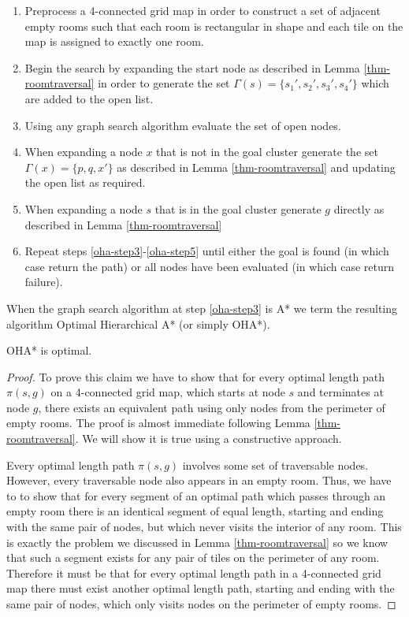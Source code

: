 \begin{enumerate}
\item{\label{oha-step1} Preprocess a 4-connected grid map in order to construct a set of adjacent empty rooms such that 
each room is rectangular in shape and each tile on the map is assigned to exactly one room. }
\item{\label{oha-step2} Begin the search by expanding the start node as described in 
Lemma \ref{thm-roomtraversal} in order to generate the set 
$\Gamma(s) = \lbrace s_{1}', s_{2}', s_{3}', s_{4}'\rbrace$ which are added to the open list. }
\item{\label{oha-step3} Using any graph search algorithm evaluate the set of open nodes.}
\item{\label{oha-step4} When expanding a node $x$ that is not in the goal cluster generate the set 
$\Gamma(x) = \lbrace p, q, x' \rbrace$ as described in Lemma \ref{thm-roomtraversal} and updating the open
list as required.} 
\item{\label{oha-step5} When expanding a node $s$ that is in the goal cluster generate $g$ directly as 
described in Lemma \ref{thm-roomtraversal}} 
\item{Repeat steps \ref{oha-step3}-\ref{oha-step5} until either the goal is found (in which case return
the path) or all nodes have been evaluated (in which case return failure).}
\end{enumerate}
When the graph search algorithm at step \ref{oha-step3} is A* we term the resulting algorithm 
Optimal Hierarchical A* (or simply OHA*).


\begin{mytheorem}
OHA* is optimal. 
\end{mytheorem}
\begin{proof}
To prove this claim we have to show that for every optimal length path $\pi(s, g)$ 
on a 4-connected grid map, which starts at node $s$ and terminates at node $g$, 
there exists an equivalent path using only nodes from the perimeter of empty rooms.
The proof is almost immediate following Lemma \ref{thm-roomtraversal}. 
We will show it is true using a constructive approach.
\par
Every optimal length path $\pi(s, g)$  involves some set of traversable nodes.
However, every traversable node also appears in an empty room.
Thus, we have to to show that for every segment of an optimal path which passes through 
an empty room there is an identical segment of equal length, starting and ending
with the same pair of nodes, but which never visits the interior of any room.
This is exactly the problem we discussed in Lemma \ref{thm-roomtraversal} 
so we know that such a segment exists for any pair of tiles on the perimeter of any room.
Therefore it must be that for every optimal length path in a 4-connected grid map there must exist
another optimal length path, starting and ending with the same pair of nodes, which
only visits nodes on the perimeter of empty rooms. 
\end{proof}

